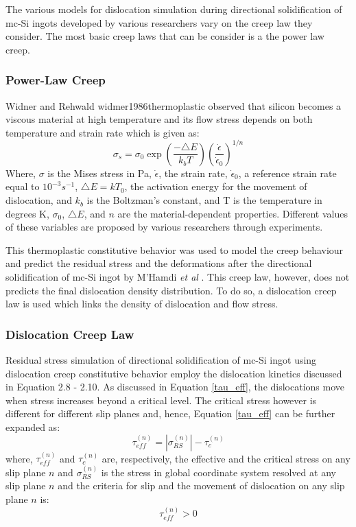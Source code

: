 The various models for dislocation simulation during directional solidification of mc-Si ingots developed by various researchers \cite{takahashi2010generation,nakano2011numerical,meese2006thermo} vary on the creep law they consider. The most basic creep laws that can be consider is a the power law creep.

\subsubsection{Power-Law Creep }
Widner and Rehwald widmer1986thermoplastic observed that silicon becomes a viscous material at high temperature and its flow stress depends on both temperature and strain rate which is given as:
\begin{equation}
\sigma_{s} = \sigma_{0} \exp \left ( \frac{-\triangle E}{k_{b} T} \right ) \left ( \frac{\dot{\epsilon}}{\dot{\epsilon}_{0}} \right ) ^{1/n}
\label {power-creep}
\end{equation}
Where, $\sigma$ is the Mises stress in Pa, $\dot{\epsilon}$, the strain rate, $\dot{\epsilon}_{0}$, a reference strain rate equal to $10^{-3} s^{-1}$, $\triangle E = k T_{0}$, the activation energy for the movement of dislocation, and $k_{b}$ is the Boltzman's constant, and T is the temperature in degrees K, $\sigma_{0}$, $\triangle E$, and $n$ are the material-dependent properties. Different values of these variables are proposed by various researchers \cite{patel1963macroscopic,siethoff1968lattice,yonenaga1978dislocation} through experiments.

This thermoplastic constitutive behavior was used to model the creep behaviour and predict the residual stress and the deformations after the directional solidification of mc-Si ingot by M'Hamdi \textit{et al} \cite{meese2006thermo}. This creep law, however, does not predicts the final dislocation density distribution. To do so, a dislocation creep law is used which links the density of dislocation and flow stress. 

\subsubsection{Dislocation Creep Law}

Residual stress simulation of directional solidification of mc-Si ingot using dislocation creep constitutive behavior employ the dislocation kinetics discussed in Equation 2.8 - 2.10. As discussed in Equation \ref{tau_eff}, the dislocations move when stress increases beyond a critical level. The critical stress however is different for different slip planes \cite{miyazaki2007dislocation} and, hence, Equation \ref{tau_eff} can be further expanded as:  
\begin{equation}
\tau^{(n)}_{eff} =  \left | \sigma^{(n)}_{RS} \right | - \tau^{(n)}_{c}
\label {cr-slip}
\end{equation}
where, $\tau^{(n)}_{eff}$ and $\tau^{(n)}_{c}$ are, respectively, the effective and the critical stress on any slip plane $n$ and $\sigma^{(n)}_{RS}$ is the stress in global coordinate system resolved at any slip plane $n$ and the criteria for slip and the movement of dislocation on any slip plane $n$ is:
\[ \tau^{(n)}_{eff} > 0 \] 

